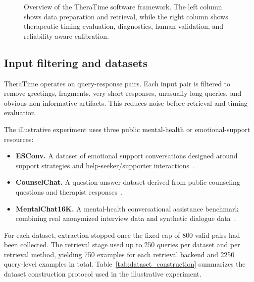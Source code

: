 \documentclass[preprint,12pt,a4paper]{elsarticle}
\begin{document}
\begin{figure}[t]
{%
}
\caption{Overview of the TheraTime software framework. The left column shows data preparation and retrieval, while the right column shows therapeutic timing evaluation, diagnostics, human validation, and reliability-aware calibration.}
\label{fig:framework_overview}
\end{figure}

\subsection{Input filtering and datasets}
\label{subsec:datasets}

TheraTime operates on query-response pairs. Each input pair is filtered to remove greetings, fragments, very short responses, unusually long queries, and obvious non-informative artifacts. This reduces noise before retrieval and timing evaluation.

The illustrative experiment uses three public mental-health or emotional-support resources:

\begin{itemize}
    \item \textbf{ESConv.} A dataset of emotional support conversations designed around support strategies and help-seeker/supporter interactions~\cite{Liu2021ESConv}.
    \item \textbf{CounselChat.} A question-answer dataset derived from public counseling questions and therapist responses~\cite{Bertagnolli2018CounselChat}.
    \item \textbf{MentalChat16K.} A mental-health conversational assistance benchmark combining real anonymized interview data and synthetic dialogue data~\cite{Xu2025MentalChat16K}.
\end{itemize}

For each dataset, extraction stopped once the fixed cap of 800 valid pairs had been collected. The retrieval stage used up to 250 queries per dataset and per retrieval method, yielding 750 examples for each retrieval backend and 2250 query-level examples in total. Table~\ref{tab:dataset_construction} summarizes the dataset construction protocol used in the illustrative experiment.
\end{document}
